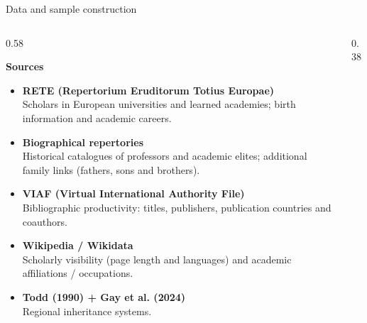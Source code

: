 \documentclass[aspectratio=169,10pt]{beamer}
\begin{document}
\begin{frame}{Data and sample construction}

\begin{columns}[T,onlytextwidth]

\begin{column}{0.58\textwidth}

\textbf{Sources}

\vspace{0.15em}

\begin{itemize}
    \setlength{\itemsep}{0.30em}

    \item \textbf{RETE (Repertorium Eruditorum Totius Europae)}\\[-0.10em]
    {\small
    Scholars in European universities and learned academies;
    birth information and academic careers.}

    \item \textbf{Biographical repertories}\\[-0.10em]
    {\small
    Historical catalogues of professors and academic elites;
    additional family links (fathers, sons and brothers).}

    \item \textbf{VIAF (Virtual International Authority File)}\\[-0.10em]
    {\small
    Bibliographic productivity: titles, publishers,
    publication countries and coauthors.}

    \item \textbf{Wikipedia / Wikidata}\\[-0.10em]
    {\small
    Scholarly visibility (page length and languages) and
    academic affiliations / occupations.}

    \item \textbf{Todd (1990) + Gay et al. (2024)}\\[-0.10em]
    {\small
    Regional inheritance systems.}

\end{itemize}

\end{column}

\begin{column}{0.38\textwidth}


\end{column}
\end{columns}
\end{frame}
\end{document}
